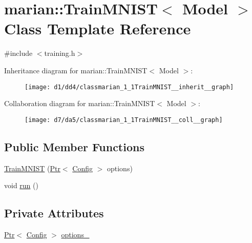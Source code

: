\hypertarget{classmarian_1_1TrainMNIST}{}\section{marian\+:\+:Train\+M\+N\+I\+ST$<$ Model $>$ Class Template Reference}
\label{classmarian_1_1TrainMNIST}


{\ttfamily \#include $<$training.\+h$>$}



Inheritance diagram for marian\+:\+:Train\+M\+N\+I\+ST$<$ Model $>$\+:
\nopagebreak
\begin{figure}[H]
\begin{center}
\leavevmode
\texttt{[image: d1/dd4/classmarian\_1\_1TrainMNIST\_\_inherit\_\_graph]}
\end{center}
\end{figure}


Collaboration diagram for marian\+:\+:Train\+M\+N\+I\+ST$<$ Model $>$\+:
\nopagebreak
\begin{figure}[H]
\begin{center}
\leavevmode
\texttt{[image: d7/da5/classmarian\_1\_1TrainMNIST\_\_coll\_\_graph]}
\end{center}
\end{figure}
\subsection*{Public Member Functions}
\begin{DoxyCompactItemize}
\item 
\hyperlink{classmarian_1_1TrainMNIST_a7b7baf3f95481ce2d3a5ccaeea5c167e}{Train\+M\+N\+I\+ST} (\hyperlink{namespacemarian_ad1a373be43a00ef9ce35666145137b08}{Ptr}$<$ \hyperlink{classmarian_1_1Config}{Config} $>$ options)
\item 
void \hyperlink{classmarian_1_1TrainMNIST_a5dbea84161b6257b405b6c18a081989d}{run} ()
\end{DoxyCompactItemize}
\subsection*{Private Attributes}
\begin{DoxyCompactItemize}
\item 
\hyperlink{namespacemarian_ad1a373be43a00ef9ce35666145137b08}{Ptr}$<$ \hyperlink{classmarian_1_1Config}{Config} $>$ \hyperlink{classmarian_1_1TrainMNIST_ae36f7408da78a03ee64f6f8eb807e6e8}{options\+\_\+}
\end{DoxyCompactItemize}


